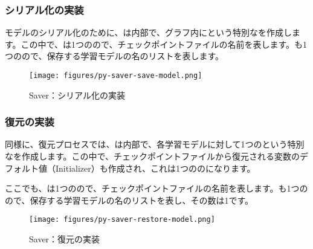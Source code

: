 \begin{content}
\subsubsection{シリアル化の実装}

モデルのシリアル化のために、は内部で、グラフ内にという特別なを作成します。この中で、は1つのので、チェックポイントファイルの名前を表します。も1つのので、保存する学習モデルの名のリストを表します。

\begin{figure}[!htbp]
\centering
\texttt{[image: figures/py-saver-save-model.png]}
\caption{Saver：シリアル化の実装}
 \label{fig:py-saver-save-model}
\end{figure}

\subsubsection{復元の実装}

同様に、復元プロセスでは、は内部で、各学習モデルに対して1つのという特別なを作成します。この中で、チェックポイントファイルから復元される変数のデフォルト値（Initializer）も作成され、これは1つののになります。

ここでも、は1つのので、チェックポイントファイルの名前を表します。も1つのので、保存する学習モデルの名のリストを表し、その数は1です。

\begin{figure}[!htbp]
\centering
\texttt{[image: figures/py-saver-restore-model.png]}
\caption{Saver：復元の実装}
 \label{fig:py-saver-restore-model}
\end{figure}

\end{content}
